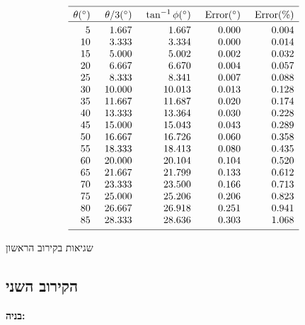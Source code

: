 \begin{table}[t]
\[
%
\begin{array}{r@{\hspace{5mm}}r@{\hspace{5mm}}r@{\hspace{5mm}}r@{\hspace{5mm}}r}
\hline
\noalign{\smallskip}
\theta ({}^\circ) & \theta/3 ({}^\circ)& \tan^{-1} \phi ({}^\circ) & \mathrm{Error} ({}^\circ) & \mathrm{Error (\%)}\\\hline
\noalign{\smallskip}
  5 &    1.667 &    1.667  &     0.000 &    0.004 \\
 10 &    3.333 &    3.334  &     0.000 &    0.014 \\
 15 &    5.000 &    5.002  &     0.002 &    0.032 \\
 20 &    6.667 &    6.670  &     0.004 &    0.057 \\
 25 &    8.333 &    8.341  &     0.007 &    0.088 \\
 30 &   10.000 &   10.013  &     0.013 &    0.128 \\
 35 &   11.667 &   11.687  &     0.020 &    0.174 \\
 40 &   13.333 &   13.364  &     0.030 &    0.228 \\
 45 &   15.000 &   15.043  &     0.043 &    0.289 \\
 50 &   16.667 &   16.726  &     0.060 &    0.358 \\
 55 &   18.333 &   18.413  &     0.080 &    0.435 \\
 60 &   20.000 &   20.104  &     0.104 &    0.520 \\
 65 &   21.667 &   21.799  &     0.133 &    0.612 \\
 70 &   23.333 &   23.500  &     0.166 &    0.713 \\
 75 &   25.000 &   25.206  &     0.206 &    0.823 \\
 80 &   26.667 &   26.918  &     0.251 &    0.941 \\
 85 &   28.333 &   28.636  &     0.303 &    1.068 \\
 \noalign{\smallskip}
 \hline
 \end{array}
\]
\caption{שגיאות בקירוב הראשון}\label{t.trisect-first}
\end{table}

\subsection{הקירוב השני}

\noindent\textbf{בניה:}

